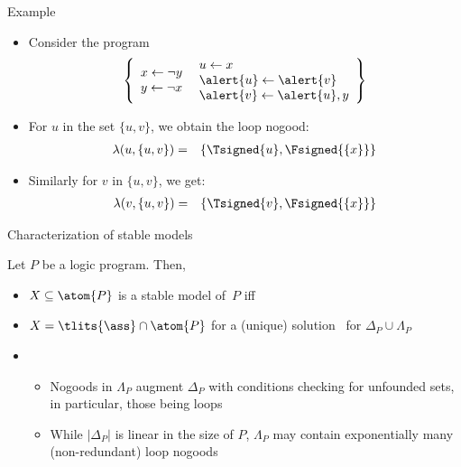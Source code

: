 \begin{frame}{Example}
  \begin{itemize}
  \item<1-> Consider the program
    \[
    \left\{
      \begin{array}{l}
        x  \leftarrow  \neg y\\
        y  \leftarrow  \neg x
      \end{array}
      \
      \begin{array}{l}
        u  \leftarrow  x\\
        \alert{u}  \leftarrow  \alert{v}\\
        \alert{v}  \leftarrow  \alert{u}, y
      \end{array}
    \right\}
    \]
  \item<2-> For $u$ in the set $\{u,v\}$, we obtain the loop nogood:
    \begin{eqnarray*}
      \lambda(u,\{u,v\}) &=& \{\Tsigned{u},\Fsigned{\{x\}}\}
    \end{eqnarray*}
  \item<3-> [] Similarly for $v$ in $\{u,v\}$, we get:
    \begin{eqnarray*}
      \lambda(v,\{u,v\}) &=& \{\Tsigned{v},\Fsigned{\{x\}}\}
    \end{eqnarray*}
  \end{itemize}
\end{frame}
\begin{frame}{Characterization of stable models}
\begin{center}\pause
  \begin{minipage}[t]{0.8\linewidth}
    \begin{theorem}
      Let $P$ be a logic program. Then,
      \par\smallskip
      \begin{itemize}
      \item [] $X\subseteq\atom{P}$ is a stable model of~$P$ \alert{iff}
      \item [] $X=\tlits{\ass}\cap\atom{P}$ for a (unique) solution \ass\ for $\Delta_P\cup\Lambda_P$
    \end{itemize}
  \end{theorem}
  \end{minipage}
\end{center}
\bigskip
\pause
\begin{itemize}
\item {} \
\begin{itemize}\normalsize
\item
Nogoods in $\Lambda_P$ augment $\Delta_P$
with conditions checking for \alert{unfounded sets},
in particular,
those being loops
\item
While $|\Delta_P|$ is linear in the size of $P$,
$\Lambda_P$ may contain \alert{exponentially many} (non-redundant) loop nogoods
\end{itemize}
\end{itemize}
\end{frame}
%
